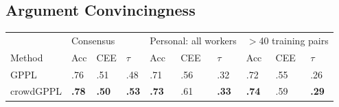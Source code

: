 \subsection{Argument Convincingness}\label{sec:exp_scale}


\begin{table}
 \centering
 \small
 \setlength{\tabcolsep}{4pt}
\begin{tabular}{ l l l l@{\hskip 1.0cm} l l l@{\hskip 1.0cm} l l l}
\hline
 & \multicolumn{3}{l}{Consensus} & 
 \multicolumn{3}{l}{Personal: all workers} &\multicolumn{3}{l}{$>$40 training pairs} \\
 Method & Acc & CEE & $\tau$ & Acc & CEE & $\tau$ & Acc & CEE & $\tau$ \\ 
  \midrule
 GPPL %
  & .76 & .51 & .48 & .71 & .56 & .32 & .72 & .55 & .26 \\ %
 crowdGPPL %
 & \textbf{.78} & \textbf{.50} & \textbf{.53} & \textbf{ .73} & .61 & \textbf{.33} & \textbf{.74} & .59 & \textbf{.29}  \\ %

\end{tabular}
\end{table}
